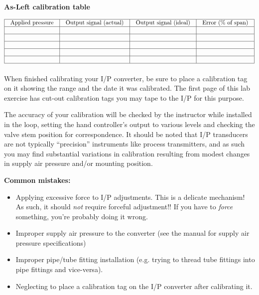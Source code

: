 \begin{itemize}
\vskip 10pt

{\bf As-Left calibration table}


$$\vbox{\offinterlineskip
\halign{\strut
\vrule \quad\hfil # \ \hfil & 
\vrule \quad\hfil # \ \hfil & 
\vrule \quad\hfil # \ \hfil & 
\vrule \quad\hfil # \ \hfil \vrule \cr
\noalign{\hrule}
%
Applied pressure & Output signal (actual) & Output signal (ideal) & Error (\% of span) \cr
%
\noalign{\hrule}
%
 &  &  & \cr
%
\noalign{\hrule}
%
 &  &  & \cr
%
\noalign{\hrule}
%
 &  &  & \cr
%
\noalign{\hrule}
%
 &  &  & \cr
%
\noalign{\hrule}
%
 &  &  & \cr
%
\noalign{\hrule}
} %
}$$ %

When finished calibrating your I/P converter, be sure to place a calibration tag on it showing the range and the date it was calibrated.  The first page of this lab exercise has cut-out calibration tags you may tape to the I/P for this purpose.

The accuracy of your calibration will be checked by the instructor while installed in the loop, setting the hand controller's output to various levels and checking the valve stem position for correspondence.  It should be noted that I/P transducers are not typically ``precision'' instruments like process transmitters, and as such you may find substantial variations in calibration resulting from modest changes in supply air pressure and/or mounting position.

\vskip 10pt

{\bf Common mistakes:}

\begin{itemize}
\item{} Applying excessive force to I/P adjustments.  This is a delicate mechanism!  As such, it should {\it not} require forceful adjustment!!  If you have to {\it force} something, you're probably doing it wrong.
\item{} Improper supply air pressure to the converter (see the manual for supply air pressure specifications)
\item{} Improper pipe/tube fitting installation (e.g. trying to thread tube fittings into pipe fittings and vice-versa).
\item{} Neglecting to place a calibration tag on the I/P converter after calibrating it.
\end{itemize}









\end{itemize}
